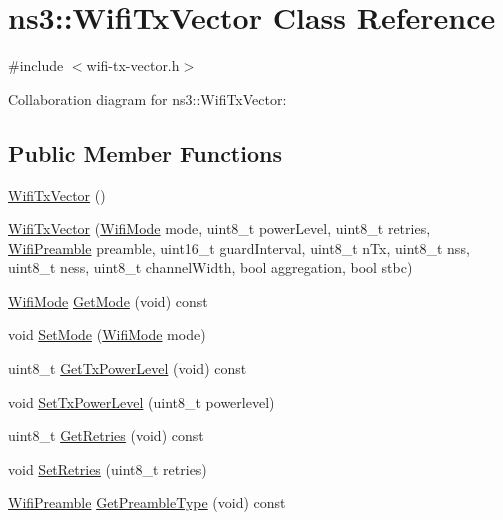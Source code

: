 \hypertarget{classns3_1_1WifiTxVector}{}\section{ns3\+:\+:Wifi\+Tx\+Vector Class Reference}
\label{classns3_1_1WifiTxVector}


{\ttfamily \#include $<$wifi-\/tx-\/vector.\+h$>$}



Collaboration diagram for ns3\+:\+:Wifi\+Tx\+Vector\+:
\subsection*{Public Member Functions}
\begin{DoxyCompactItemize}
\item 
\hyperlink{classns3_1_1WifiTxVector_ac1c4292ed1849c06fbbf2325e81ac97e}{Wifi\+Tx\+Vector} ()
\item 
\hyperlink{classns3_1_1WifiTxVector_a00b923987865526472f7cf6f2b514216}{Wifi\+Tx\+Vector} (\hyperlink{classns3_1_1WifiMode}{Wifi\+Mode} mode, uint8\+\_\+t power\+Level, uint8\+\_\+t retries, \hyperlink{group__wifi_ga5e94a56cb338a14ffbbb19c6a41251eb}{Wifi\+Preamble} preamble, uint16\+\_\+t guard\+Interval, uint8\+\_\+t n\+Tx, uint8\+\_\+t nss, uint8\+\_\+t ness, uint8\+\_\+t channel\+Width, bool aggregation, bool stbc)
\item 
\hyperlink{classns3_1_1WifiMode}{Wifi\+Mode} \hyperlink{classns3_1_1WifiTxVector_a497b1f11cad4b8b26251dfa07c9ad1d6}{Get\+Mode} (void) const 
\item 
void \hyperlink{classns3_1_1WifiTxVector_af39f17fec348c22f8c963bcb6bb5fc53}{Set\+Mode} (\hyperlink{classns3_1_1WifiMode}{Wifi\+Mode} mode)
\item 
uint8\+\_\+t \hyperlink{classns3_1_1WifiTxVector_a7c98bd9609ff1c5cefa6e22d6908a2fe}{Get\+Tx\+Power\+Level} (void) const 
\item 
void \hyperlink{classns3_1_1WifiTxVector_a25743cd89a5cb95ec22a9e584fa044f3}{Set\+Tx\+Power\+Level} (uint8\+\_\+t powerlevel)
\item 
uint8\+\_\+t \hyperlink{classns3_1_1WifiTxVector_a27df35708d454fb82969580ded5769ee}{Get\+Retries} (void) const 
\item 
void \hyperlink{classns3_1_1WifiTxVector_a63488f9e63061332f2da42dbef8bf005}{Set\+Retries} (uint8\+\_\+t retries)
\item 
\hyperlink{group__wifi_ga5e94a56cb338a14ffbbb19c6a41251eb}{Wifi\+Preamble} \hyperlink{classns3_1_1WifiTxVector_ae90c4a0ea2f75d445fbc7a82f958c23f}{Get\+Preamble\+Type} (void) const 

\end{DoxyCompactItemize}
